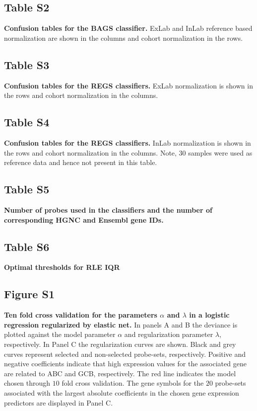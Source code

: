 \documentclass[10pt,letterpaper]{article}
\begin{document}
\subsection*{Table S2}\label{tab:BAGShemaclass}
\textbf{Confusion tables for the BAGS classifier.} ExLab and InLab reference
based normalization are shown in the columns and cohort normalization in the
rows.

\subsection*{Table S3}\label{tab:confusiondrugonebyone}
\textbf{Confusion tables for the REGS classifiers.}
ExLab normalization is shown in the rows and cohort normalization in the
columns.

\subsection*{Table S4}\label{tab:confusiondrugreference}
\textbf{Confusion tables for the REGS classifiers.}
InLab normalization is shown in the rows and cohort normalization in
the columns. Note, 30 samples were used as reference data and hence not present
in this table.

\subsection*{Table S5}\label{probeTable}
\textbf{Number of probes used in the classifiers and the number of corresponding HGNC and Ensembl gene IDs.}

\subsection*{Table S6}\label{rleTable}
\textbf{Optimal thresholds for RLE IQR}



\subsection*{Figure S1}
\label{fig:crossval}
\textbf{Ten fold cross validation for the parameters $\alpha$ and $\lambda$ in a logistic regression regularized by elastic net.}
In panels A and B the deviance is plotted against the model parameter $\alpha$ and regularization parameter $\lambda$, respectively.
In Panel C the regularization curves are shown.
Black and grey curves represent selected and non-selected probe-sets, respectively.
Positive and negative coefficients indicate that high expression values for the associated gene are related to ABC and GCB, respectively.
The red line indicates the model chosen through $10$ fold cross validation.
The gene symbols for the $20$ probe-sets associated with the largest absolute coefficients in the chosen gene expression predictors are displayed in Panel C.
\end{document}
